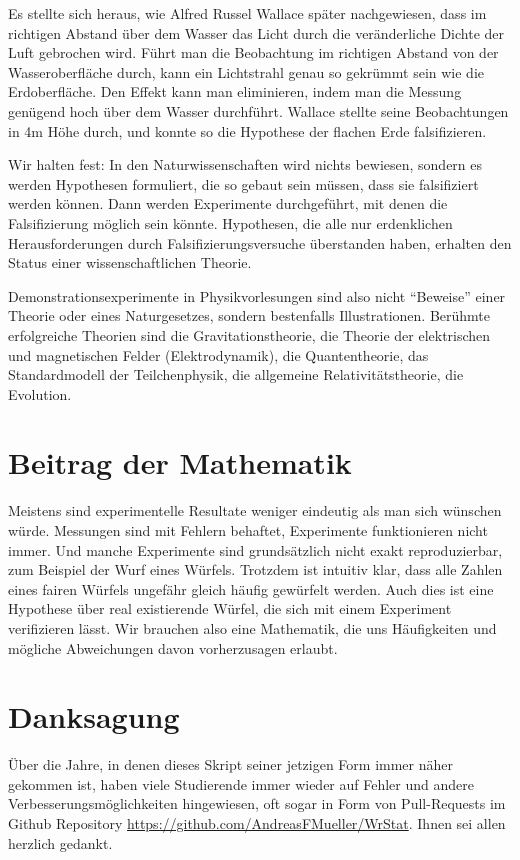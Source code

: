 Es stellte sich heraus, wie Alfred Russel Wallace später nachgewiesen,
dass im richtigen Abstand über dem Wasser das Licht durch die
veränderliche Dichte der Luft gebrochen wird.
Führt man die Beobachtung im richtigen Abstand von der Wasseroberfläche
durch, kann ein Lichtstrahl genau so gekrümmt sein wie die Erdoberfläche.
Den Effekt kann man eliminieren, indem man die Messung genügend hoch
über dem Wasser durchführt. 
Wallace stellte seine Beobachtungen in 4m Höhe durch, und konnte
so die Hypothese der flachen Erde falsifizieren.

Wir halten fest: In den Naturwissenschaften wird nichts bewiesen,
sondern es werden Hypothesen formuliert, die so gebaut sein
müssen, dass sie falsifiziert werden können.
Dann werden Experimente durchgeführt, mit denen die Falsifizierung
möglich sein könnte.
Hypothesen, die alle nur erdenklichen Herausforderungen durch
Falsifizierungsversuche überstanden haben, erhalten den Status
einer wissenschaftlichen Theorie.

Demonstrationsexperimente in Physikvorlesungen sind also nicht
``Beweise'' einer Theorie oder eines Naturgesetzes, sondern bestenfalls
Illustrationen.
Berühmte erfolgreiche Theorien sind die Gravitationstheorie, die
Theorie der elektrischen und magnetischen Felder (Elektrodynamik),
die Quantentheorie, das Standardmodell der Teilchenphysik, die
allgemeine Relativitätstheorie, die Evolution.

\section*{Beitrag der Mathematik}
Meistens sind experimentelle Resultate weniger eindeutig als man sich
wünschen würde.
Messungen sind mit Fehlern behaftet, Experimente funktionieren nicht
immer.
Und manche Experimente sind grundsätzlich nicht exakt reproduzierbar,
zum Beispiel der Wurf eines Würfels.
Trotzdem ist intuitiv klar, dass alle Zahlen eines fairen Würfels
ungefähr gleich häufig gewürfelt werden.
Auch dies ist eine Hypothese über real existierende Würfel, die
sich mit einem Experiment verifizieren lässt.
Wir brauchen also eine Mathematik, die uns Häufigkeiten und mögliche
Abweichungen davon vorherzusagen erlaubt.

\section*{Danksagung}
Über die Jahre, in denen dieses Skript seiner jetzigen Form immer näher
gekommen ist, haben viele Studierende immer wieder auf Fehler und andere
Verbesserungsmöglichkeiten hingewiesen, oft sogar in Form von Pull-Requests
im Github Repository \url{https://github.com/AndreasFMueller/WrStat}.
Ihnen sei allen herzlich gedankt.


